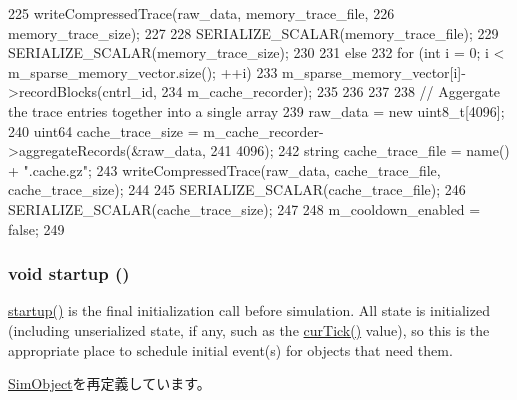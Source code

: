 \begin{DoxyCode}
{{225         writeCompressedTrace(raw_data, memory_trace_file,
226                              memory_trace_size);
227 
228         SERIALIZE_SCALAR(memory_trace_file);
229         SERIALIZE_SCALAR(memory_trace_size);
230 
231     } else {
232         for (int i = 0; i < m_sparse_memory_vector.size(); ++i) {
233             m_sparse_memory_vector[i]->recordBlocks(cntrl_id,
234                                                     m_cache_recorder);
235         }
236     }
237 
238     // Aggergate the trace entries together into a single array
239     raw_data = new uint8_t[4096];
240     uint64 cache_trace_size = m_cache_recorder->aggregateRecords(&raw_data,
241                                                                  4096);
242     string cache_trace_file = name() + ".cache.gz";
243     writeCompressedTrace(raw_data, cache_trace_file, cache_trace_size);
244 
245     SERIALIZE_SCALAR(cache_trace_file);
246     SERIALIZE_SCALAR(cache_trace_size);
247 
248     m_cooldown_enabled = false;
249 }
\end{DoxyCode}
\hypertarget{classRubySystem_aecc7d8debf54990ffeaaed5bac7d7d81}{
\subsubsection[{startup}]{\setlength{\rightskip}{0pt plus 5cm}void startup ()}}
\label{classRubySystem_aecc7d8debf54990ffeaaed5bac7d7d81}
\hyperlink{classRubySystem_aecc7d8debf54990ffeaaed5bac7d7d81}{startup()} is the final initialization call before simulation. All state is initialized (including unserialized state, if any, such as the \hyperlink{statistics_8hh_a7acdccbf0d35ce0c159c0cdd36371b22}{curTick()} value), so this is the appropriate place to schedule initial event(s) for objects that need them. 

\hyperlink{classSimObject_aecc7d8debf54990ffeaaed5bac7d7d81}{SimObject}を再定義しています。


